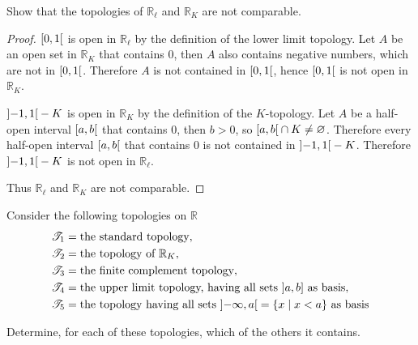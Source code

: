 \begin{exercise}\label{chapter2:section13:exercise6}
    Show that the topologies of $\mathbb{R}_{\ell}$ and $\mathbb{R}_{K}$ are not comparable.
\end{exercise}

\begin{proof}
    $\left[{0, 1}\right[$ is open in $\mathbb{R}_{\ell}$ by the definition of the lower limit topology. Let $A$ be an open set in $\mathbb{R}_{K}$ that contains $0$, then $A$ also contains negative numbers, which are not in $\left[{0, 1}\right[$. Therefore $A$ is not contained in $\left[{0, 1}\right[$, hence $\left[{0, 1}\right[$ is not open in $\mathbb{R}_{K}$.

    $\left]{-1, 1}\right[ - K$ is open in $\mathbb{R}_{K}$ by the definition of the $K$-topology. Let $A$ be a half-open interval $\left[{a, b}\right[$ that contains $0$, then $b > 0$, so $\left[{a, b}\right[\cap K\ne \varnothing$. Therefore every half-open interval $\left[{a, b}\right[$ that contains $0$ is not contained in $\left]{-1, 1}\right[ - K$. Therefore $\left]{-1, 1}\right[ - K$ is not open in $\mathbb{R}_{\ell}$.

    Thus $\mathbb{R}_{\ell}$ and $\mathbb{R}_{K}$ are not comparable.
\end{proof}

\begin{exercise}\label{chapter2:section13:exercise7}
    Consider the following topologies on $\mathbb{R}$
    \begin{align*}
        \mathscr{T}_{1} & = \text{the standard topology}, \\
        \mathscr{T}_{2} & = \text{the topology of $\mathbb{R}_{K}$}, \\
        \mathscr{T}_{3} & = \text{the finite complement topology}, \\
        \mathscr{T}_{4} & = \text{the upper limit topology, having all sets $\left]{a, b}\right]$ as basis}, \\
        \mathscr{T}_{5} & = \text{the topology having all sets $\left]{-\infty, a}\right[ = \{ x \mid x < a \}$ as basis}
    \end{align*}

    Determine, for each of these topologies, which of the others it contains.
\end{exercise}

